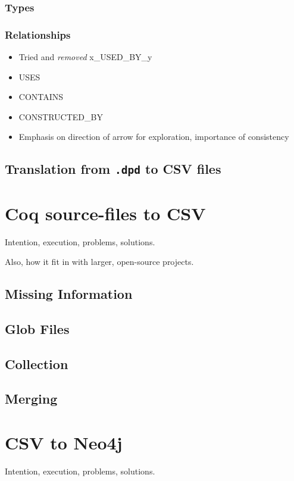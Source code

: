 \subsubsection{Types}

\subsubsection{Relationships}

\begin{itemize}
  \item Tried and \emph{removed} x\_USED\_BY\_y
  \item USES
  \item CONTAINS
  \item CONSTRUCTED\_BY
  \item Emphasis on direction of arrow for exploration, importance of consistency
\end{itemize}

\subsection{Translation from \texttt{.dpd} to CSV files}

\section{Coq source-files to CSV}
Intention, execution, problems, solutions.

Also, how it fit in with larger, open-source projects.

\subsection{Missing Information}

\subsection{Glob Files}

\subsection{Collection}

\subsection{Merging}

\section{CSV to Neo4j}
Intention, execution, problems, solutions.

